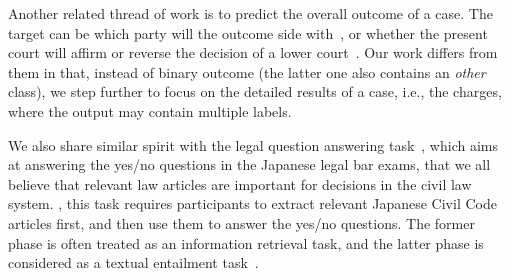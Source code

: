 Another related thread of work %
is to predict the overall outcome of a case. The target can be 
which party will the outcome side with~\cite{aletras2016predicting}, or whether the present court will affirm or reverse the decision of a lower court~\cite{katz2016general}. Our work differs from them in that, instead of binary outcome (the latter one also contains an \emph{other} class), we step further to focus on the detailed results of a case, i.e., the charges, where the output may contain multiple labels. 



We also share similar spirit with the legal question answering task~\cite{COLIEE14}, which aims at answering the yes/no questions in the Japanese legal bar exams, that we all believe that relevant law articles are important for decisions in the civil law system. 
, this task requires participants to extract relevant Japanese Civil Code articles first, 
and then use them to answer the yes/no questions. 
The former phase is often treated as an information retrieval task, and the latter phase is considered as a textual entailment task~\cite{kim2014legal,carvalho2016lexical}. 

